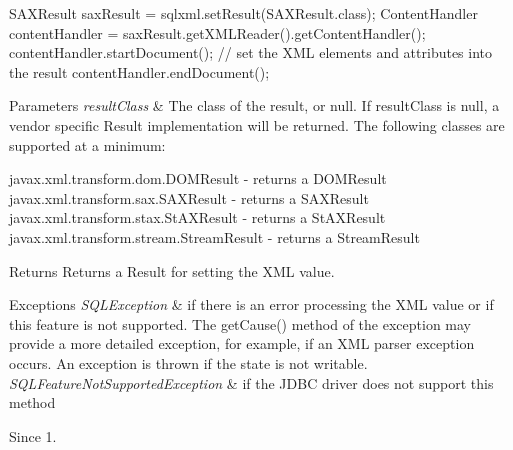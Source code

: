 \begin{DoxyPre}
SAXResult saxResult = sqlxml.setResult(SAXResult.class);
ContentHandler contentHandler = saxResult.getXMLReader().getContentHandler();
contentHandler.startDocument();
// set the XML elements and attributes into the result
contentHandler.endDocument();
\end{DoxyPre}



\begin{DoxyParams}{Parameters}
{\em result\+Class} & The class of the result, or null. If result\+Class is null, a vendor specific Result implementation will be returned. The following classes are supported at a minimum\+:\\
\hline
\end{DoxyParams}

\begin{DoxyPre}
   javax.xml.transform.dom.DOMResult - returns a DOMResult
   javax.xml.transform.sax.SAXResult - returns a SAXResult
   javax.xml.transform.stax.StAXResult - returns a StAXResult
   javax.xml.transform.stream.StreamResult - returns a StreamResult
           \end{DoxyPre}


\begin{DoxyReturn}{Returns}
Returns a Result for setting the X\+ML value. 
\end{DoxyReturn}

\begin{DoxyExceptions}{Exceptions}
{\em S\+Q\+L\+Exception} & if there is an error processing the X\+ML value or if this feature is not supported. The get\+Cause() method of the exception may provide a more detailed exception, for example, if an X\+ML parser exception occurs. An exception is thrown if the state is not writable. \\
\hline
{\em S\+Q\+L\+Feature\+Not\+Supported\+Exception} & if the J\+D\+BC driver does not support this method \\
\hline
\end{DoxyExceptions}
\begin{DoxySince}{Since}
1. 
\end{DoxySince}
\mbox{\label{classcom_1_1mysql_1_1jdbc_1_1_j_d_b_c4_mysql_s_q_l_x_m_l_a7d7e5eb51cdc1ba0ba7529ccf5ee177f}} 

